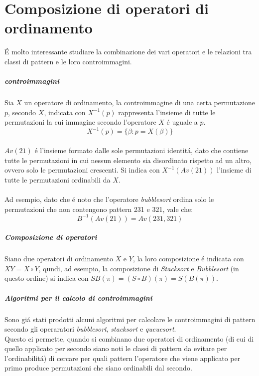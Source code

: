 \chapter{Composizione di operatori di ordinamento}
\'E molto interessante studiare la combinazione dei vari operatori e le relazioni tra classi di pattern e le loro controimmagini.
\paragraph*{controimmagini} Sia $X$ un operatore di ordinamento, la controimmagine di una certa permutazione $p$, secondo $X$, indicata con $X^{-1}(p)$ rappresenta l'insieme di tutte le permutazioni la cui immagine secondo l'operatore $X$ \'e uguale a $p$.$$X^{-1}(p) = \{\beta : p = X(\beta)\}$$\\
$Av(21)$ \'e l'insieme formato dalle sole permutazioni identit\'a, dato che contiene tutte le permutazioni in cui nessun elemento sia disordinato rispetto ad un altro, ovvero solo le permutazioni crescenti. Si indica con $X^{-1}(Av(21))$ l'insieme di tutte le permutazioni ordinabili da $X$.\\\\
Ad esempio, dato che \'e noto che l'operatore \textit{bubblesort} ordina solo le permutazioni che non contengono pattern 231 e 321\cite{claesson2012sorting}, vale che:$$B^{-1}(Av(21)) = Av(231,321)$$
\paragraph*{Composizione di operatori} Siano due operatori di ordinamento $X$ e $Y$, la loro composizione \'e indicata con $ XY = X \circ Y$, qundi, ad esempio, la composizione di \textit{Stacksort} e \textit{Bubblesort} (in questo ordine) si indica con $SB(\pi) = (S \circ B)(\pi) = S(B(\pi))$.
\paragraph*{Algoritmi per il calcolo di controimmagini} Sono gi\'a stati prodotti alcuni algoritmi per calcolare le controimmagini di pattern secondo gli operaratori \textit{bubblesort}\cite{albert2010inverse}, \textit{stacksort}\cite{claesson2012sorting} e \textit{queuesort}\cite{magnusson2013sorting}\cite{cioni2021characterization}.\\
Questo ci permette, quando si combinano due operatori di ordinamento (di cui di quello applicato per secondo siano noti le classi di pattern da evitare per l'ordinabilit\'a) di cercare per quali pattern l'operatore che viene applicato per primo produce permutazioni che siano ordinabili dal secondo.
